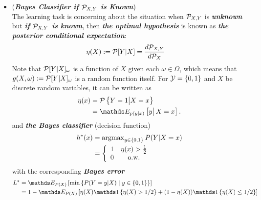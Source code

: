\documentclass[11pt]{article}
\begin{document}
\begin{itemize}
\item \begin{remark} (\emph{\textbf{Bayes Classifier if ${\mathcal P}_{X, Y}$ is Known}})\\
The learning task is concerning about the situation when ${\mathcal P}_{X, Y}$ is \emph{\textbf{unknown}} but \emph{\textbf{if ${\mathcal P}_{X, Y}$ is \underline{known}}}, then \emph{\textbf{the optimal hypothesis}} is known as \emph{\textbf{the posterior conditional expectation}}:
\begin{align*}
\eta(X) := {\mathcal P}[Y | X] &= \frac{d {\mathcal P}_{X, Y}}{d {\mathcal P}_{X}}
\end{align*} Note that ${\mathcal P}[Y | X]_{\omega}$ is a function of $X$ given each $\omega \in \Omega$, which means that $g(X, \omega) := {\mathcal P}[Y | X]_{\omega}$ is a random function itself.
For ${\mathcal Y} = \left\{0,1\right\}$ and $X$ be discrete random variables, it can be written as 
\begin{align}
\eta(x) &= \cP\set{Y=1 \big| X=x} \nonumber\\
 &= \E{p(y|x)}{y\big|\,X=x}. \label{expr: cond_Prob_fun}
\end{align} 
and \emph{\textbf{the Bayes classifier}} (decision function)
\begin{align}
h^{*}(x)  &= \operatorname{argmax}\limits_{y\in \left\{0,1\right\}}P(Y| X=x)\nonumber\\
&=\left\{ \begin{array}{cc}
1 & \eta(x) > \frac{1}{2} \\ 
0 & \text{o.w.}
\end{array} \right. \label{expr: Bayes_classif}
\end{align} with the corresponding \emph{\textbf{Bayes error}}
\begin{align}
L^{*}&=\E{P(X)}{\min\set{ P(Y=y| X) \;|\; y\in \set{0, 1 }}} \nonumber\\
&= 1- \E{P(X)}{ \eta(X)\ind{\eta(X)>1/2} + (1-\eta(X))\ind{\eta(X)\le 1/2}  }
\end{align}
\end{remark}


\end{itemize}
\end{document}
